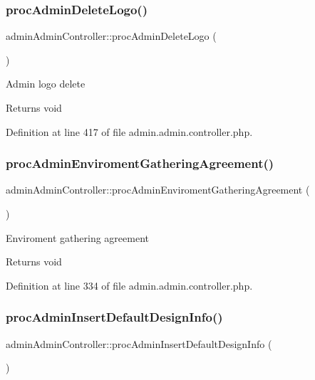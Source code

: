 \subsubsection{\texorpdfstring{proc\+Admin\+Delete\+Logo()}{procAdminDeleteLogo()}}
{\footnotesize\ttfamily admin\+Admin\+Controller\+::proc\+Admin\+Delete\+Logo (\begin{DoxyParamCaption}{ }\end{DoxyParamCaption})}

Admin logo delete \begin{DoxyReturn}{Returns}
void 
\end{DoxyReturn}


Definition at line 417 of file admin.\+admin.\+controller.\+php.

\mbox{\label{classadminAdminController_a8ef62179d5114d3d718846179d907bf0}} 
\subsubsection{\texorpdfstring{proc\+Admin\+Enviroment\+Gathering\+Agreement()}{procAdminEnviromentGatheringAgreement()}}
{\footnotesize\ttfamily admin\+Admin\+Controller\+::proc\+Admin\+Enviroment\+Gathering\+Agreement (\begin{DoxyParamCaption}{ }\end{DoxyParamCaption})}

Enviroment gathering agreement \begin{DoxyReturn}{Returns}
void 
\end{DoxyReturn}


Definition at line 334 of file admin.\+admin.\+controller.\+php.

\mbox{\label{classadminAdminController_ab0b62d09b5f73640ab9a7a7c5a58e579}} 
\subsubsection{\texorpdfstring{proc\+Admin\+Insert\+Default\+Design\+Info()}{procAdminInsertDefaultDesignInfo()}}
{\footnotesize\ttfamily admin\+Admin\+Controller\+::proc\+Admin\+Insert\+Default\+Design\+Info (\begin{DoxyParamCaption}{ }\end{DoxyParamCaption})}



